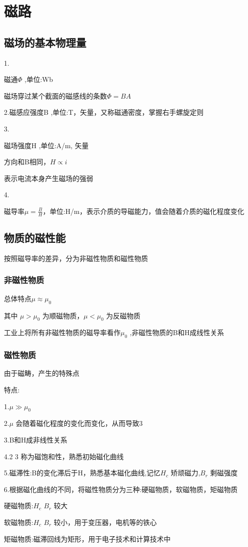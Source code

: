 \documentclass[11pt,twoside,a4paper]{ctexart}
\begin{document}
    \section{磁路}
    \subsection{磁场的基本物理量}
    1.
    \begin{minipage}[t]{0.9\linewidth}
    磁通$\varPhi $ ,单位:Wb

    磁场穿过某个截面的磁感线的条数$\varPhi = BA $
    \end{minipage}


    2.磁感应强度B ,单位:T，矢量，又称磁通密度，掌握右手螺旋定则

    3.
    \begin{minipage}[t]{0.9\linewidth}
    磁场强度H ,单位:A/m, 矢量
    
    方向和B相同，$H\propto i  $
    
    
    表示电流本身产生磁场的强弱
    

    \end{minipage}  

    4.
    \begin{minipage}[t]{0.9\linewidth}
    磁导率$\mu = \tfrac{B}{H} $，单位:H/m，表示介质的导磁能力，值会随着介质的磁化程度变化
    \end{minipage}
    \subsection{物质的磁性能}
    按照磁导率的差异，分为非磁性物质和磁性物质
    \subsubsection{非磁性物质}
    总体特点$\mu  \approx \mu_0 $ 

    其中 $\mu > \mu_0 $ 为顺磁物质，$\mu < \mu_0 $ 为反磁物质

    工业上将所有非磁性物质的磁导率看作$\mu_0 $ ,非磁性物质的B和H成线性关系
    \subsubsection{磁性物质}
    由于磁畴，产生的特殊点

    特点:
    \begin{minipage}[t]{0.9\linewidth}
        1.$\mu \gg \mu_0 $

        2.$\mu $ 会随着磁化程度的变化而变化，从而导致3

        3.B和H成非线性关系

        4.2 3 称为磁饱和性，熟悉初始磁化曲线

        5.磁滞性:B的变化滞后于H，熟悉基本磁化曲线,记忆$H_c $ 矫顽磁力,$B_r $ 剩磁强度

        6.根据磁化曲线的不同，将磁性物质分为三种:硬磁物质，软磁物质，矩磁物质

        \quad 硬磁物质:$H_c $ $B_r $ 较大

        \quad 软磁物质:$H_c $ $B_r $ 较小，用于变压器，电机等的铁心

        \quad 矩磁物质:磁滞回线为矩形，用于电子技术和计算技术中
    \end{minipage}
\end{document}
